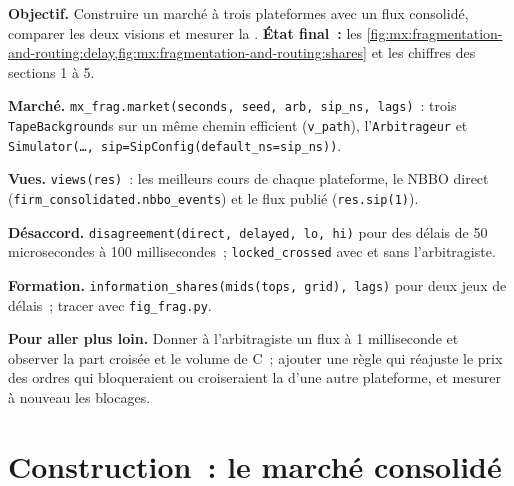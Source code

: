 \begin{tutorial}
\textbf{Objectif.} Construire un marché à trois plateformes avec un flux consolidé, comparer les deux visions et mesurer la .
\textbf{État final~:} les \cref{fig:mx:fragmentation-and-routing:delay,fig:mx:fragmentation-and-routing:shares} et les chiffres des sections 1 à 5.
\begin{tutsteps}
\item \textbf{Marché.} \texttt{mx\_frag.market(seconds, seed, arb, sip\_ns, lags)}~: trois \texttt{TapeBackground}s sur un même chemin efficient
(\texttt{v\_path}), l'\texttt{Arbitrageur} et \texttt{Simulator(\dots, sip=SipConfig(default\_ns=sip\_ns))}.
\item \textbf{Vues.} \texttt{views(res)}~: les meilleurs cours de chaque plateforme, le NBBO direct (\texttt{firm\_consolidated.nbbo\_events}) et le flux publié
(\texttt{res.sip(1)}).
\item \textbf{Désaccord.} \texttt{disagreement(direct, delayed, lo, hi)} pour des délais de 50 microsecondes à 100 millisecondes~;
\texttt{locked\_crossed} avec et sans l'arbitragiste.
\item \textbf{Formation.} \texttt{information\_shares(mids(tops, grid), lags)} pour deux jeux de délais~; tracer avec \texttt{fig\_frag.py}.
\end{tutsteps}
\textbf{Pour aller plus loin.} Donner à l'arbitragiste un flux à 1 milliseconde et observer la part croisée et le volume de C~; ajouter une règle qui réajuste le prix des ordres
qui bloqueraient ou croiseraient la  d'une autre plateforme, et mesurer à nouveau les blocages.
\end{tutorial}

\section{Construction~: le marché consolidé}\label{bld:mx:fragmentation-and-routing:consolidated}

